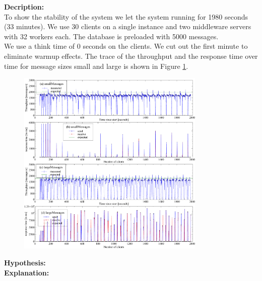 \documentclass[11pt]{article}
\begin{document}
\textbf{Decription:}\\
To show the stability of the system we let the system running for 1980 seconds (33 minutes). We use 30 clients on a single instance and two middleware servers with 32 workers each. The database is preloaded with 5000 messages.\\
We use a think time of 0 seconds on the clients.
We cut out the first minute to eliminate warmup effects.
The trace of the throughput and the response time over time for message sizes small and large is shown in Figure \ref{fig:longrun}.\\
\begin{figure}[ht!]
  \begin{center}
    \includegraphics[width=0.8\textwidth]{../results/longrun.pdf}
    \caption{}
    \label{fig:longrun}
  \end{center}
\end{figure}
\textbf{Hypothesis:}\\

\textbf{Explanation:}\\
\end{document}
